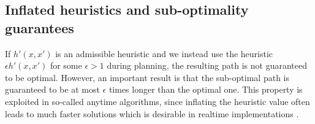 \subsection{Inflated heuristics and sub-optimality guarantees}\label{sec:sub_optimal}
If $h'(x, x')$ is an admissible heuristic and we instead use the heuristic $\epsilon h'(x, x')$ for some $\epsilon>1$ during planning,
the resulting path is not guaranteed to be optimal. However, an important result is that the sub-optimal path is guaranteed to be at most $\epsilon$ times 
longer than the optimal one. This property is exploited in so-called anytime algorithms, since inflating the heuristic value often leads to much faster solutions which is 
desirable in realtime implementations \cite{anytime_astar}. 